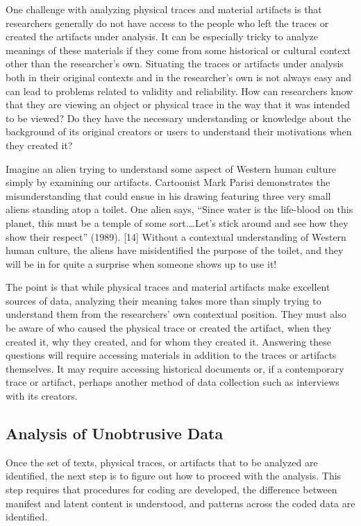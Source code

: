One challenge with analyzing physical traces and material artifacts is that researchers generally do not have access to the people who left the traces or created the artifacts under analysis. It can be especially tricky to analyze meanings of these materials if they come from some historical or cultural context other than the researcher's own. Situating the traces or artifacts under analysis both in their original contexts and in the researcher's own is not always easy and can lead to problems related to validity and reliability. How can researchers know that they are viewing an object or physical trace in the way that it was intended to be viewed? Do they have the necessary understanding or knowledge about the background of its original creators or users to understand their motivations when they created it?

Imagine an alien trying to understand some aspect of Western human culture simply by examining our artifacts. Cartoonist Mark Parisi demonstrates the misunderstanding that could ensue in his drawing featuring three very small aliens standing atop a toilet. One alien says, ``Since water is the life-blood on this planet, this must be a temple of some sort.…Let's stick around and see how they show their respect'' (1989). [14] Without a contextual understanding of Western human culture, the aliens have misidentified the purpose of the toilet, and they will be in for quite a surprise when someone shows up to use it!

The point is that while physical traces and material artifacts make excellent sources of data, analyzing their meaning takes more than simply trying to understand them from the researchers' own contextual position. They must also be aware of who caused the physical trace or created the artifact, when they created it, why they created, and for whom they created it. Answering these questions will require accessing materials in addition to the traces or artifacts themselves. It may require accessing historical documents or, if a contemporary trace or artifact, perhaps another method of data collection such as interviews with its creators.

\subsection{Analysis of Unobtrusive Data}

Once the set of texts, physical traces, or artifacts that to be analyzed are identified, the next step is to figure out how to proceed with the analysis. This step requires that procedures for coding are developed, the difference between manifest and latent content is understood, and patterns across the coded data are identified.

